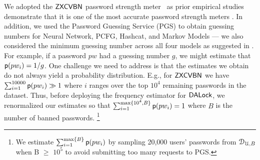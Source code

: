 We adopted the $\mathsf{ZXCVBN}$ password strength meter~\cite{USENIX:Wheeler16} as prior empirical studies demonstrate that it is one of the most accurate password strength meters \cite{CCS:GolDur18}. In addition, we used the Password Guessing Service (PGS) \cite{USENIX:USBCCKKMMS15,USENIX:MUSKBCC16} to obtain guessing numbers for Neural Network, PCFG, Hashcat, and Markov Models ---  we also considered the minimum guessing number across all four models as suggested in \cite{USENIX:USBCCKKMMS15}. For example, if a password $pw$ had a guessing number $g$, we might estimate that $\textsf{p}(pw_i) =1/g$. One challenge we need to address is that the estimates we obtain do not always yield a probability distribution. E.g., for $\mathsf{ZXCVBN}$ we have $\sum_{i=1}^{10000}\textsf{p}(pw_i) \gg 1$ where $i$ ranges over the top $10^4$ remaining passwords in the dataset. Thus, before deploying the frequency estimator for $\mathsf{DALock}$, we renormalized our estimates so that $\sum_{i=1}^{\max\{10^4, B\}}\textsf{p}(pw_i) =1$ where $B$ is the number of banned passwords. \footnote{We estimate $\sum_{i=1}^{\max\{B\}}\textsf{p}(pw_i)$ by sampling 20,000 users' passwords from $\mathcal{D}_{{\mathcal{U},B}}$ when B $\ge$ $10^5$ to avoid submitting too many requests to PGS.}











